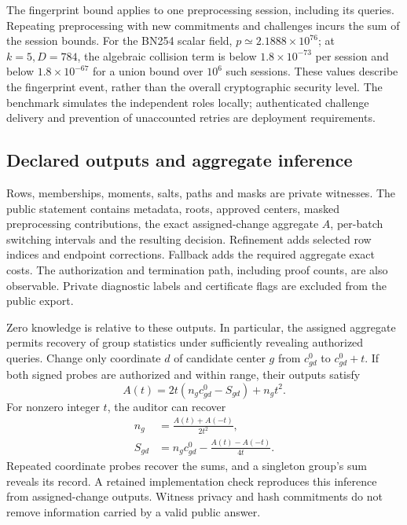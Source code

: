 The fingerprint bound applies to one preprocessing session, including its
queries. Repeating preprocessing with new commitments and challenges incurs
the sum of the session bounds. For the BN254 scalar field,
$p\simeq2.1888\times10^{76}$; at $k=5,D=784$, the algebraic collision term is
below $1.8\times10^{-73}$ per session and below $1.8\times10^{-67}$ for a
union bound over $10^6$ such sessions. These values describe the fingerprint
event, rather than the overall cryptographic security level. The benchmark
simulates the independent roles locally; authenticated challenge delivery
and prevention of unaccounted retries are deployment requirements.

\subsection{Declared outputs and aggregate inference}\label{sec:leakage}
Rows, memberships, moments, salts, paths and masks are private witnesses.
The public statement contains metadata, roots, approved centers, masked
preprocessing contributions, the exact assigned-change aggregate $A$,
per-batch switching intervals and the resulting decision. Refinement adds
selected row indices and endpoint corrections. Fallback adds the required
aggregate exact costs. The authorization and termination path, including
proof counts, are also observable. Private diagnostic labels and
certificate flags are excluded from the public export.

Zero knowledge is relative to these outputs. In particular, the assigned
aggregate permits recovery of group statistics under sufficiently revealing
authorized queries. Change only coordinate $d$ of candidate center $g$
from $c^0_{gd}$ to $c^0_{gd}+t$. If both signed probes are authorized and
within range, their outputs satisfy
\begin{equation}\label{eq:probe-leakage}
 A(t)=2t(n_gc^0_{gd}-S_{gd})+n_gt^2.
\end{equation}
For nonzero integer $t$, the auditor can recover
\begin{align}
 n_g&=\frac{A(t)+A(-t)}{2t^2},\\
 S_{gd}&=n_gc^0_{gd}-\frac{A(t)-A(-t)}{4t}.
\end{align}
Repeated coordinate probes recover the sums, and a singleton group's sum
reveals its record. A retained implementation check reproduces this
inference from assigned-change outputs. Witness privacy and hash
commitments do not remove information carried by a valid public answer.

